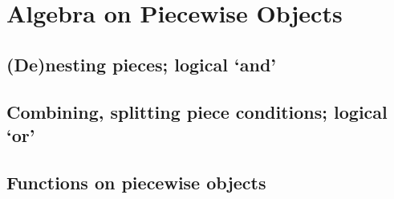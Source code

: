 \section{Algebra on Piecewise Objects}
\subsection{(De)nesting pieces; logical `and'}
\subsection{Combining, splitting piece conditions; logical `or'}
\subsection{Functions on piecewise objects}
\newpage{}